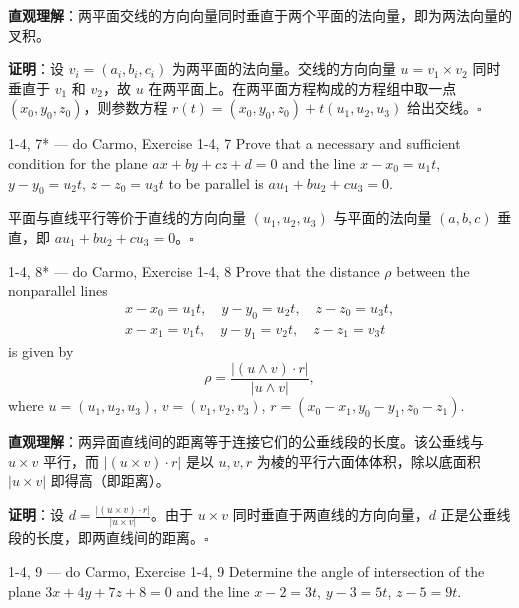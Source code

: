 \begin{solution}
\textbf{直观理解}：两平面交线的方向向量同时垂直于两个平面的法向量，即为两法向量的叉积。

\textbf{证明}：设 $v_i = (a_i,b_i,c_i)$ 为两平面的法向量。交线的方向向量 $u = v_1 \times v_2$ 同时垂直于 $v_1$ 和 $v_2$，故 $u$ 在两平面上。在两平面方程构成的方程组中取一点 $(x_0,y_0,z_0)$，则参数方程 $r(t) = (x_0,y_0,z_0) + t(u_1,u_2,u_3)$ 给出交线。$\square$
\end{solution}

\begin{exercise}{1-4, 7* — do Carmo, Exercise 1-4, 7}
Prove that a necessary and sufficient condition for the plane $ax + by + cz + d = 0$ and the line $x - x_0 = u_1 t$, $y - y_0 = u_2 t$, $z - z_0 = u_3 t$ to be parallel is $a u_1 + b u_2 + c u_3 = 0$.
\end{exercise}

\begin{solution}
平面与直线平行等价于直线的方向向量 $(u_1,u_2,u_3)$ 与平面的法向量 $(a,b,c)$ 垂直，即 $au_1+bu_2+cu_3 = 0$。$\square$
\end{solution}

\begin{exercise}{1-4, 8* — do Carmo, Exercise 1-4, 8}
Prove that the distance $\rho$ between the nonparallel lines
\[
\begin{array}{l}
x - x_0 = u_1 t, \quad y - y_0 = u_2 t, \quad z - z_0 = u_3 t, \\
x - x_1 = v_1 t, \quad y - y_1 = v_2 t, \quad z - z_1 = v_3 t
\end{array}
\]
is given by
\[
\rho = \frac{|(u \wedge v) \cdot r|}{|u \wedge v|},
\]
where $u = (u_1, u_2, u_3)$, $v = (v_1, v_2, v_3)$, $r = (x_0 - x_1, y_0 - y_1, z_0 - z_1)$.
\end{exercise}

\begin{solution}
\textbf{直观理解}：两异面直线间的距离等于连接它们的公垂线段的长度。该公垂线与 $u\times v$ 平行，而 $|(u\times v)\cdot r|$ 是以 $u,v,r$ 为棱的平行六面体体积，除以底面积 $|u\times v|$ 即得高（即距离）。

\textbf{证明}：设 $d = \frac{|(u\times v)\cdot r|}{|u\times v|}$。由于 $u\times v$ 同时垂直于两直线的方向向量，$d$ 正是公垂线段的长度，即两直线间的距离。$\square$
\end{solution}

\begin{exercise}{1-4, 9 — do Carmo, Exercise 1-4, 9}
Determine the angle of intersection of the plane $3x + 4y + 7z + 8 = 0$ and the line $x - 2 = 3t$, $y - 3 = 5t$, $z - 5 = 9t$.
\end{exercise}

